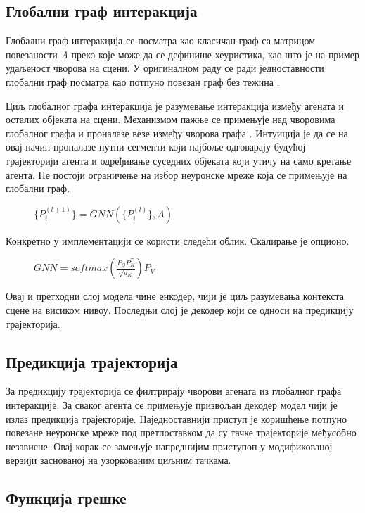\documentclass[11pt,oneside]{memoir}
\begin{document}
\subsection{Глобални граф интеракција}

Глобални граф интеракција се посматра као класичан граф са матрицом повезаности \textit{A} преко које може да се дефинише хеуристика, као што је на пример удаљеност
чворова на сцени. У оригиналном раду се ради једноставности глобални граф посматра као потпуно повезан граф без тежина \cite{vectornet}.

Циљ глобалног графа интеракција је разумевање интеракција између агената и осталих објеката на сцени. Механизмом пажње се примењује над 
чворовима глобалног графа и проналазе везе између чворова графа \cite{attention_is_all_you_need}. Интуиција је да се на овај начин проналазе путни сегменти који најбоље одговарају будућој трајекторији агента и 
одређивање суседних објеката који утичу на само кретање агента. Не постоји ограничење на избор неуронске мреже која се примењује на глобални граф.

\begin{figure}[H]
  \centering
  $\{P^{(l+1)}_{i}\} = GNN(\{P^{(l)}_{i}\}, A)$
\end{figure}

\noindent Конкретно у имплементацији се користи следећи облик. Скалирање је опционо.

\begin{figure}[H]
  \centering
  $GNN = softmax(\frac{P_{Q}P^{T}_{K}}{\sqrt{d_{K}}})P_{V}$
\end{figure}

Овај и претходни слој модела чине енкодер, чији је циљ разумевања контекста сцене на висиком нивоу. Последњи слој је декодер
који се односи на предикцију трајекторија.

\subsection{Предикција трајекторија}

За предикцију трајекторија се филтрирају чворови агената из глобалног графа интеракције. За сваког агента се примењује призвољан декодер модел
чији је излаз предикција трајекторије. Наједноставнији приступ је коришћење потпуно повезане неуронске мреже под претпоставком да су 
тачке трајекторије међусобно независне. Овај корак се замењује напреднијим приступоп у модификованој верзији заснованој на узоркованим циљним тачкама.

\subsection{Функција грешке}
\end{document}
